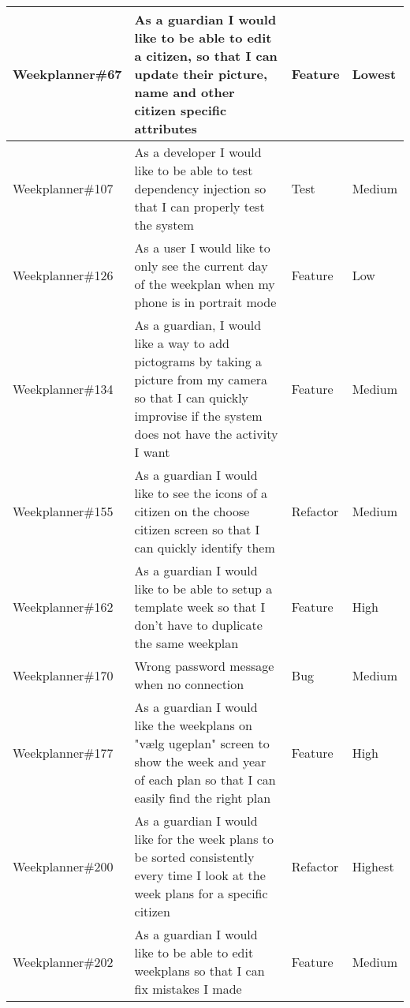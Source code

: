 \begin{longtable}{|p{2.9cm}|p{7cm}|p{1.4cm}|p{1.5cm}|}
    Weekplanner\#67  & As a guardian I would like to be able to edit a citizen, so that I can update their picture, name and other citizen specific attributes                                   & Feature & Lowest   \\ \hline
    Weekplanner\#107 & As a developer I would like to be able to test dependency injection so that I can properly test the system                                                                & Test & Medium   \\ \hline
    Weekplanner\#126 & As a user I would like to only see the current day of the weekplan when my phone is in portrait mode                                                                      & Feature & Low   \\ \hline
    Weekplanner\#134 & As a guardian, I would like a way to add pictograms by taking a picture from my camera so that I can quickly improvise if the system does not have the activity I want    & Feature & Medium    \\ \hline
    Weekplanner\#155 & As a guardian I would like to see the icons of a citizen on the choose citizen screen so that I can quickly identify them                                                 & Refactor & Medium   \\ \hline
    Weekplanner\#162 & As a guardian I would like to be able to setup a template week so that I don't have to duplicate the same weekplan                                                        & Feature & High  \\ \hline
    Weekplanner\#170 & Wrong password message when no connection                                                                                                                                 & Bug     & Medium \\ \hline
    Weekplanner\#177 & As a guardian I would like the weekplans on "vælg ugeplan" screen to show the week and year of each plan so that I can easily find the right plan                         & Feature & High  \\ \hline
    Weekplanner\#200 & As a guardian I would like for the week plans to be sorted consistently every time I look at the week plans for a specific citizen                                        & Refactor & Highest   \\ \hline
    Weekplanner\#202 & As a guardian I would like to be able to edit weekplans so that I can fix mistakes I made                                                                                 & Feature & Medium   \\ \hline

\end{longtable}
